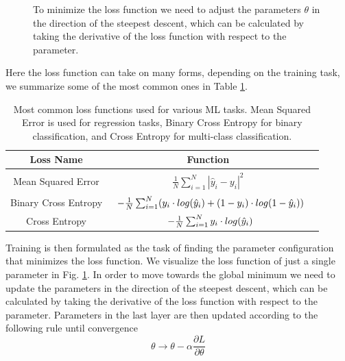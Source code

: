 \begin{figure}[h]
    
    \caption{To minimize the loss function we need to adjust the parameters $\theta$ in the direction of the steepest descent, which can be calculated by taking the derivative of the loss function with respect to the parameter.}
    \label{fig:loss}
\end{figure}
Here the loss function can take on many forms, depending on the training task, we summarize some of the most common ones in Table \ref{table:losses}.
\begin{table}
    \centering
    \renewcommand{\arraystretch}{1.3}
    \begin{tabular}{|c| c| c|}
    Loss Name & Function \\[0.5ex] \hline
    Mean Squared Error & $\begin{array} {lcl} \frac{1}{N} \sum_{i=1}^N|\hat{y}_i - y_i|^2\end{array}$  \\ [0.5ex]
    Binary Cross Entropy & $\begin{array} {r@{}l@{}} -\frac{1}{N} \sum_{i=1}^N (y_i \cdot log(\hat{y}_i) + (1 - y_i) \cdot log(1-\hat{y}_i)) \end{array}$ \\ [0.5ex]
    Cross Entropy & $\begin{array} {r@{}l@{}} -\frac{1}{N} \sum_{i=1}^N y_i \cdot log(\hat{y}_i) \end{array}$ \\ [0.5ex]
    \end{tabular}
    \caption{Most common loss functions used for various ML tasks. Mean Squared Error is used for regression tasks, Binary Cross Entropy for binary classification, and Cross Entropy for multi-class classification.}
    \label{table:losses}
\end{table}
Training is then formulated as the task of finding the parameter configuration that minimizes the loss function.
We visualize the loss function of just a single parameter in Fig. \ref{fig:loss}.
In order to move towards the global minimum we need to update the parameters in the direction of the steepest descent, which can be calculated by taking the derivative of the loss function with respect to the parameter.
Parameters in the last layer are then updated according to the following rule until convergence
\begin{equation}
    \label{eq:optimization}
    \theta \rightarrow \theta - \alpha \frac{\partial L}{\partial \theta}
\end{equation}
